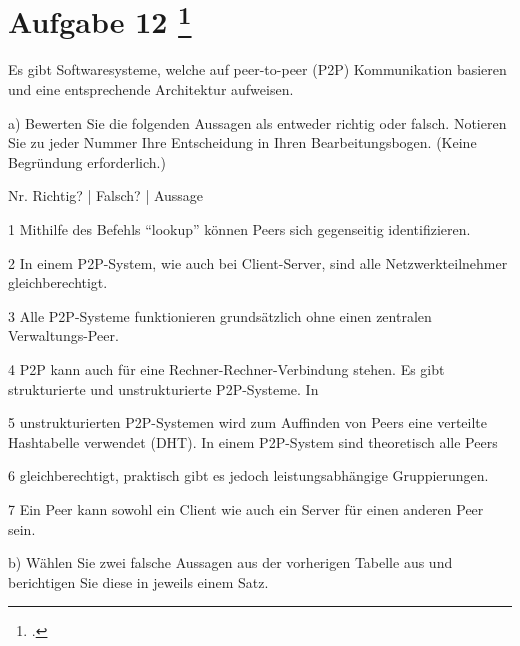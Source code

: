 \documentclass{lehramt-informatik-aufgabe}
\begin{document}
\liAufgabenTitel{}
\section{Aufgabe 12
\footcite{66116:2021:03}}

Es gibt Softwaresysteme, welche auf peer-to-peer (P2P) Kommunikation basieren und eine
entsprechende Architektur aufweisen.

a) Bewerten Sie die folgenden Aussagen als entweder richtig oder falsch. Notieren Sie zu jeder
Nummer Ihre Entscheidung in Ihren Bearbeitungsbogen. (Keine Begründung erforderlich.)

Nr. Richtig? | Falsch? | Aussage

1 Mithilfe des Befehls “lookup” können Peers sich
gegenseitig identifizieren.

2 In einem P2P-System, wie auch bei Client-Server, sind alle
Netzwerkteilnehmer gleichberechtigt.

3 Alle P2P-Systeme funktionieren grundsätzlich ohne einen
zentralen Verwaltungs-Peer.

4 P2P kann auch für eine Rechner-Rechner-Verbindung
stehen.
Es gibt strukturierte und unstrukturierte P2P-Systeme. In

5 unstrukturierten P2P-Systemen wird zum Auffinden von
Peers eine verteilte Hashtabelle verwendet (DHT).
In einem P2P-System sind theoretisch alle Peers

6 gleichberechtigt, praktisch gibt es jedoch
leistungsabhängige Gruppierungen.

7 Ein Peer kann sowohl ein Client wie auch ein Server für
einen anderen Peer sein.

b) Wählen Sie zwei falsche Aussagen aus der vorherigen Tabelle aus und berichtigen Sie diese in
jeweils einem Satz.
\end{document}
